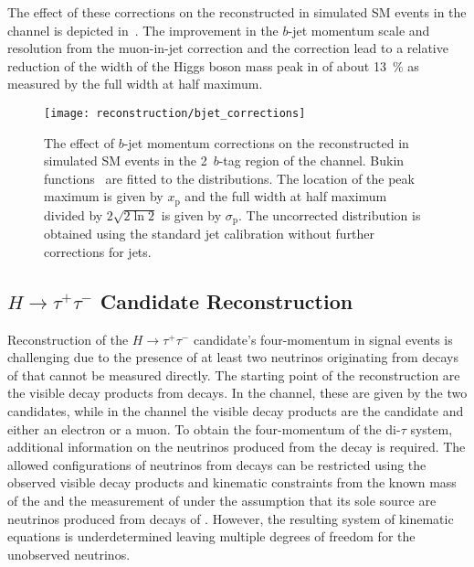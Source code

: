 The effect of these corrections on the reconstructed \mBB in simulated SM \HH
events in the \hadhad channel is depicted
in~. The improvement in the $b$-jet momentum
scale and resolution from the muon-in-jet correction and the \pTreco correction
lead to a relative reduction of the width of the Higgs boson mass peak in \mBB
of about \SI{13}{\percent} as measured by the full width at half maximum.

\begin{figure}[htbp]
  \centering

  \texttt{[image: reconstruction/bjet\_corrections]}

  \caption[The effect of $b$-jet momentum corrections on the reconstructed \mBB
  in simulated SM~\HH events in the 2~$b$-tag region of the \hadhad
  channel.]{The effect of $b$-jet momentum corrections on the reconstructed \mBB
    in simulated SM \HH events in the 2~$b$-tag region of the \hadhad
    channel. Bukin functions~\cite{Bukin:2007zha} are fitted to the \mBB
    distributions. The location of the peak maximum is given by $x_{\text{p}}$
    and the full width at half maximum divided by $2\sqrt{2 \ln 2}$ is given by
    $\sigma_{\text{p}}$.  The uncorrected distribution is obtained using the
    standard jet calibration without further corrections for \btagged jets.}%
  \label{fig:bjet_momentum_corr_mbb}
\end{figure}


\subsection{$H \to \tau^{+}\tau^{-}$ Candidate Reconstruction}%
\label{sec:htautau_reco}

Reconstruction of the $H \to \tau^{+}\tau^{-}$ candidate's four-momentum in
signal events is challenging due to the presence of at least two neutrinos
originating from decays of \tauleptons that cannot be measured directly. The
starting point of the reconstruction are the visible decay products from
\taulepton decays. In the \hadhad channel, these are given by the two \tauhadvis
candidates, while in the \lephad channel the visible decay products are the
\tauhadvis candidate and either an electron or a muon. To obtain the
four-momentum of the di-$\tau$ system, %
additional information on the neutrinos produced from the \taulepton decay is
required. The allowed configurations of neutrinos from \taulepton decays can be
restricted using the observed visible decay products and kinematic constraints
from the known mass of the \taulepton and the measurement of \pTmiss under the
assumption that its sole source are neutrinos produced from decays of
\tauleptons. However, the resulting system of kinematic equations is
underdetermined leaving multiple degrees of freedom for the unobserved
neutrinos.

